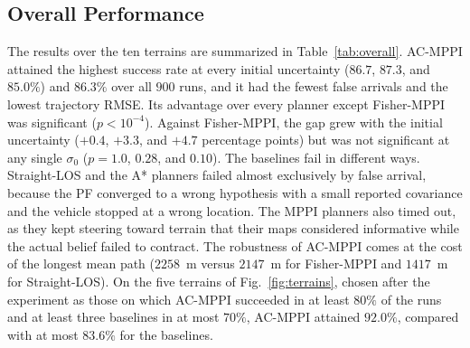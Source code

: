 \documentclass[letterpaper, 10 pt, journal, twoside]{IEEEtran}
\begin{document}
\subsection{Overall Performance}
The results over the ten terrains are summarized in Table~\ref{tab:overall}. AC-MPPI attained the highest success rate at every initial uncertainty ($86.7$, $87.3$, and $85.0\%$) and $86.3\%$ over all $900$ runs, and it had the fewest false arrivals and the lowest trajectory RMSE. Its advantage over every planner except Fisher-MPPI was significant ($p < 10^{-4}$). Against Fisher-MPPI, the gap grew with the initial uncertainty ($+0.4$, $+3.3$, and $+4.7$ percentage points) but was not significant at any single $\sigma_0$ ($p = 1.0$, $0.28$, and $0.10$). The baselines fail in different ways. Straight-LOS and the A* planners failed almost exclusively by false arrival, because the PF converged to a wrong hypothesis with a small reported covariance and the vehicle stopped at a wrong location. The MPPI planners also timed out, as they kept steering toward terrain that their maps considered informative while the actual belief failed to contract. The robustness of AC-MPPI comes at the cost of the longest mean path ($2258$~m versus $2147$~m for Fisher-MPPI and $1417$~m for Straight-LOS). On the five terrains of Fig.~\ref{fig:terrains}, chosen after the experiment as those on which AC-MPPI succeeded in at least $80\%$ of the runs and at least three baselines in at most $70\%$, AC-MPPI attained $92.0\%$, compared with at most $83.6\%$ for the baselines.
\end{document}
